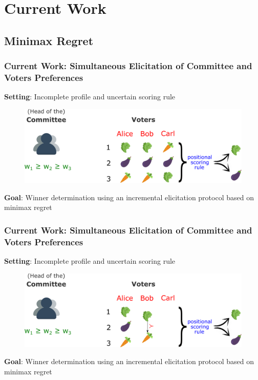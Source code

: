 \documentclass{beamer}
\begin{document}
\section{Current Work}
\subsection{Minimax Regret}

\begin{frame}
\frametitle{\textbf{Current Work:} Simultaneous Elicitation of Committee and Voters Preferences}
\textbf{Setting}: Incomplete profile and uncertain scoring rule
\begin{figure}
	\includegraphics[scale=0.35]{set.png}
\end{figure}
\textbf{Goal}: Winner determination using an incremental elicitation protocol based on minimax regret 
\end{frame}
\addtocounter{framenumber}{-1}
\begin{frame}
	\frametitle{\textbf{Current Work:} Simultaneous Elicitation of Committee and Voters Preferences}
	\textbf{Setting}: Incomplete profile and uncertain scoring rule
	\begin{figure}
		\includegraphics[scale=0.35]{set2.png}
	\end{figure}
	\textbf{Goal}: Winner determination using an incremental elicitation protocol based on minimax regret 
\end{frame}
\end{document}
